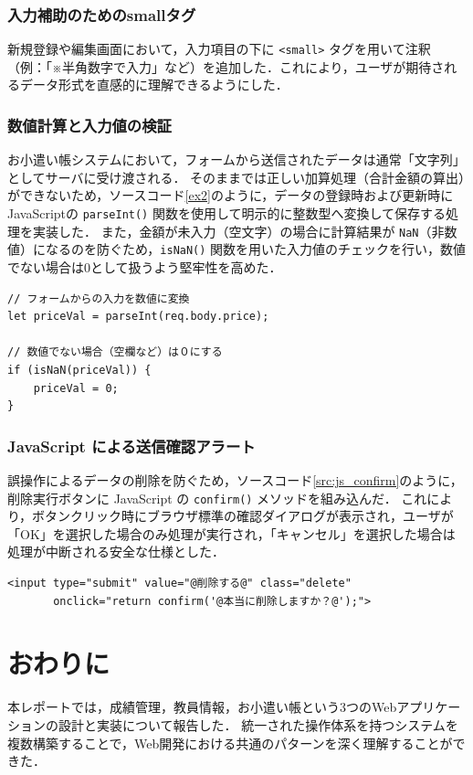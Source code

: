 \subsubsection{入力補助のためのsmallタグ}
新規登録や編集画面において，入力項目の下に \texttt{<small>} タグを用いて注釈（例：「※半角数字で入力」など）を追加した．これにより，ユーザが期待されるデータ形式を直感的に理解できるようにした．

\subsubsection{数値計算と入力値の検証}
お小遣い帳システムにおいて，フォームから送信されたデータは通常「文字列」としてサーバに受け渡される．
そのままでは正しい加算処理（合計金額の算出）ができないため，ソースコード\ref{ex2}のように，データの登録時および更新時にJavaScriptの \texttt{parseInt()} 関数を使用して明示的に整数型へ変換して保存する処理を実装した．
また，金額が未入力（空文字）の場合に計算結果が \texttt{NaN}（非数値）になるのを防ぐため，\texttt{isNaN()} 関数を用いた入力値のチェックを行い，数値でない場合は0として扱うよう堅牢性を高めた．

\begin{lstlisting}[caption=数値変換と検証の処理, label=ex2]
// フォームからの入力を数値に変換
let priceVal = parseInt(req.body.price);

// 数値でない場合（空欄など）は０にする
if (isNaN(priceVal)) {
    priceVal = 0;
}
\end{lstlisting}

\subsubsection{JavaScript による送信確認アラート}
誤操作によるデータの削除を防ぐため，ソースコード\ref{src:js_confirm}のように，削除実行ボタンに JavaScript の \texttt{confirm()} メソッドを組み込んだ．
これにより，ボタンクリック時にブラウザ標準の確認ダイアログが表示され，ユーザが「OK」を選択した場合のみ処理が実行され，「キャンセル」を選択した場合は処理が中断される安全な仕様とした．

\begin{lstlisting}[caption=削除ボタンへの確認アラート実装, label=src:js_confirm, escapechar=\@]
<input type="submit" value="@削除する@" class="delete"
       onclick="return confirm('@本当に削除しますか？@');">
\end{lstlisting}



\section{おわりに}
本レポートでは，成績管理，教員情報，お小遣い帳という3つのWebアプリケーションの設計と実装について報告した．
統一された操作体系を持つシステムを複数構築することで，Web開発における共通のパターンを深く理解することができた．

